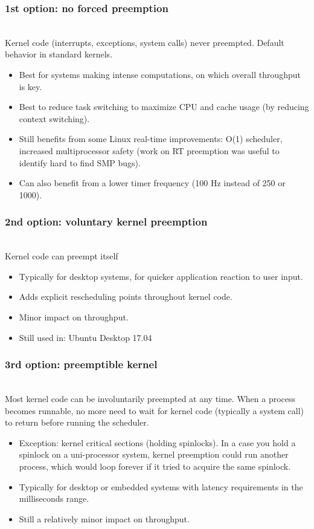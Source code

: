 \begin{frame}
  \frametitle{1st option: no forced preemption}
  \\
  Kernel code (interrupts, exceptions, system calls) never preempted.
  Default behavior in standard kernels.
  \begin{itemize}
  \item Best for systems making intense computations, on which overall
    throughput is key.
  \item Best to reduce task switching to maximize CPU and cache usage
    (by reducing context switching).
  \item Still benefits from some Linux real-time improvements: O(1)
    scheduler, increased multiprocessor safety (work on RT preemption
    was useful to identify hard to find SMP bugs).
  \item Can also benefit from a lower timer frequency (100 Hz instead
    of 250 or 1000).
  \end{itemize}
\end{frame}

\begin{frame}
  \frametitle{2nd option: voluntary kernel preemption}
  \\
  Kernel code can preempt itself
  \begin{itemize}
  \item Typically for desktop systems, for quicker application
    reaction to user input.
  \item Adds explicit rescheduling points throughout kernel code.
  \item Minor impact on throughput.
  \item Still used in: Ubuntu Desktop 17.04
  \end{itemize}
\end{frame}

\begin{frame}
  \frametitle{3rd option: preemptible kernel}
  \\
  Most kernel code can be involuntarily preempted at any time.  When a
  process becomes runnable, no more need to wait for kernel code
  (typically a system call) to return before running the scheduler.
  \begin{itemize}
  \item Exception: kernel critical sections (holding spinlocks).
    In a case you hold a spinlock on a uni-processor system, kernel preemption
    could run another process, which would loop forever if it
    tried to acquire the same spinlock.
  \item Typically for desktop or embedded systems with latency
    requirements in the milliseconds range.
  \item Still a relatively minor impact on throughput.
  \end{itemize}
\end{frame}

